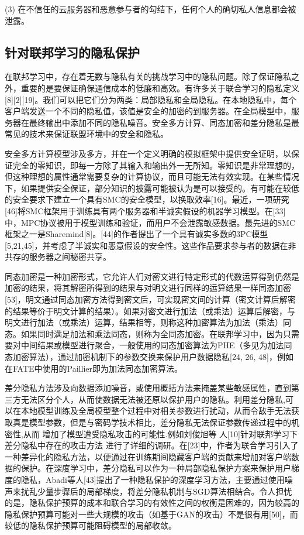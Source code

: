 (3) 在不信任的云服务器和恶意参与者的勾结下，任何个人的确切私人信息都会被泄露。



\subsection{针对联邦学习的隐私保护}
在联邦学习中，存在着无数与隐私有关的挑战学习中的隐私问题。除了保证隐私之外，重要的是要保证确保通信成本的低廉和高效。有许多关于联合学习的隐私定义[8][2][19]。我们可以把它们分为两类：局部隐私和全局隐私。在本地隐私中，每个客户端发送一个不同的隐私值，该值是安全的加密的到服务器。在全局模型中，服务器在最终输出中添加不同的隐私噪音。安全多方计算、同态加密和差分隐私是最常见的技术来保证联盟环境中的安全和隐私。

安全多方计算模型涉及多方，并在一个定义明确的模拟框架中提供安全证明，以保证完全的零知识，即每一方除了其输入和输出外一无所知。零知识是非常理想的，但这种理想的属性通常需要复杂的计算协议，而且可能无法有效实现。在某些情况下，如果提供安全保证，部分知识的披露可能被认为是可以接受的。有可能在较低的安全要求下建立一个具有SMC的安全模型，以换取效率[16]。最近，一项研究[46]将SMC框架用于训练具有两个服务器和半诚实假设的机器学习模型。在[33]中，MPC协议被用于模型训练和验证，而用户不会泄露敏感数据。最先进的SMC框架之一是Sharemind[8]。[44]的作者提出了一个具有诚实多数的3PC模型[5,21,45]，并考虑了半诚实和恶意假设的安全性。这些作品要求参与者的数据在非共存的服务器之间秘密共享。

同态加密是一种加密形式，它允许人们对密文进行特定形式的代数运算得到仍然是加密的结果，将其解密所得到的结果与对明文进行同样的运算结果一样同态加密[53]，明文通过同态加密方法得到密文后，可实现密文间的计算（密文计算后解密的结果等价于明文计算的结果）。如果对密文进行加法（或乘法）运算后解密，与明文进行加法（或乘法）运算，结果相等，则称这种加密算法为加法（乘法）同态。如果同时满足加法和乘法同态，则称为全同态加密。在联邦学习中，因为只需要对中间结果或模型进行聚合，一般使用的同态加密算法为PHE（多见为加法同态加密算法），通过加密机制下的参数交换来保护用户数据隐私[24, 26, 48]，例如在FATE中使用的Paillier即为加法同态加密算法。

差分隐私方法涉及向数据添加噪音，或使用概括方法来掩盖某些敏感属性，直到第三方无法区分个人，从而使数据无法被还原以保护用户的隐私。利用差分隐私,可以在本地模型训练及全局模型整个过程中对相关参数进行扰动，从而令敌手无法获取真是模型参数，但是与密码学技术相比，差分隐私无法保证参数传递过程中的机密性,从而 增加了模型遭受隐私攻击的可能性.例如刘俊旭等 人[10]针对联邦学习下差分隐私中存在的攻击方法 进行了详细的调研。在[23]中，作者为联合学习引入了一种差异化的隐私方法，以便通过在训练期间隐藏客户端的贡献来增加对客户端数据的保护。在深度学习中，差分隐私可以作为一种局部隐私保护方案来保护用户梯度的隐私，Abadi等人[43]提出了一种隐私保护的深度学习方法，主要通过使用噪声来扰乱少量步骤后的局部梯度，将差分隐私机制与SGD算法相结合。令人担忧的是，隐私保护预算的成本和联合学习的有效性之间的权衡是困难的，因为较高的隐私保护预算可能对一些大规模的攻击（如基于GAN的攻击）不是很有用[50]，而较低的隐私保护预算可能阻碍模型的局部收敛。


